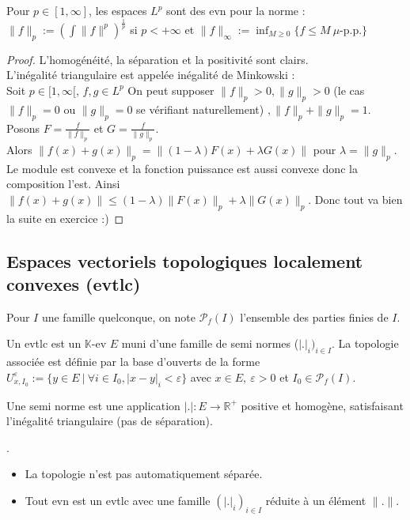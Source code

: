 \begin{proposition}
   Pour $p \in [1,\infty]$, les espaces $L^p$ sont des evn pour la norme : $\|f\|_p:=\left( \int\|f\|^p \right)^{\frac{1}{p}}$ si $p<+\infty$ et $\|f\|_\infty := \inf_{M \geq 0}\{f \leq M ~\mu \text{-p.p.}\}$ 
\end{proposition}

\begin{proof} 
    L'homogénéité, la séparation et la positivité sont clairs. \\
    L'inégalité triangulaire est appelée inégalité de Minkowski :\\
    Soit $p\in [1,\infty [$, $f,g\in L^p$ On peut supposer $\|f\|_p>0,\|g\|_p>0$ (le cas $\|f\|_p = 0$ ou $\|g\|_p=0$ se vérifiant naturellement) $, \|f\|_p+\|g\|_p=1$. Posons $F=\frac{f}{\|f\|_p}$ et $G=\frac{f}{\|g\|_p}$. \\
    Alors $\|f(x)+g(x)\|_p=\|(1-\lambda)F(x)+\lambda G(x)\|$ pour $\lambda=\|g\|_p$. Le module est convexe et la fonction puissance est aussi convexe donc la composition l'est. Ainsi $\|f(x)+g(x)\|\le (1-\lambda)\|F(x)\|_p+\lambda\|G(x)\|_p$. Donc tout va bien la suite en exercice :)
\end{proof}


\subsection{Espaces vectoriels topologiques localement convexes (evtlc)}

Pour $I$ une famille quelconque, on note $\mathcal{P}_f(I)$ l'ensemble des parties finies de $I$.

\begin{definition}
    Un evtlc est un $\mathbb{K}$-ev $E$ muni d'une famille de semi normes ($|.|_i)_{i\in I}$. La topologie associée est définie par la base d'ouverts de la forme $U_{x,I_0}^\varepsilon := \{y\in E\ |\ \forall i\in I_0, |x-y|_i<\varepsilon \} $ avec $x\in E,\ \varepsilon >0$ et $I_0\in \mathcal{P}_f(I)$.
\end{definition}

\begin{remarque}
    Une semi norme est une application $|.|:E\to \mathbb{R}^+ $ positive et homogène, satisfaisant l'inégalité triangulaire (pas de séparation).
\end{remarque}

\begin{remarque}
    .\begin{itemize}
    \item La topologie n'est pas automatiquement séparée.
    \item Tout evn est un evtlc avec une famille $(|.|_i)_{i\in I}$ réduite à un élément $\|.\|$.
\end{itemize}
\end{remarque}


